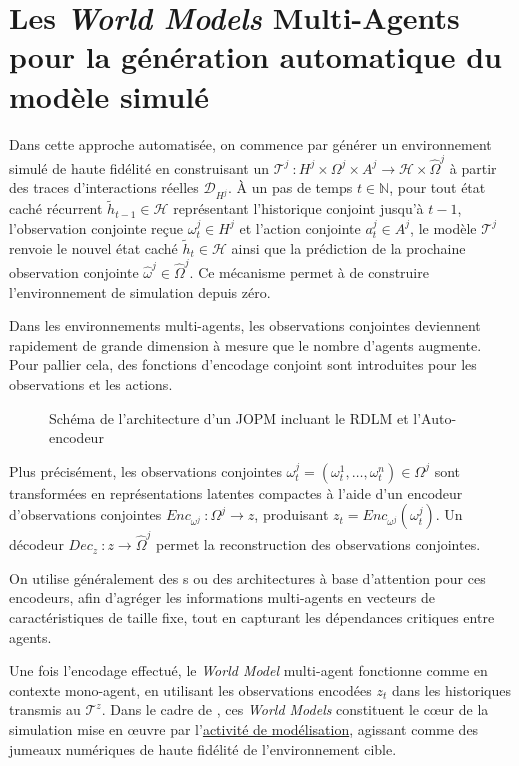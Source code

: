 \section{Les \textit{World Models} Multi-Agents pour la génération automatique du modèle simulé}

Dans cette approche automatisée, on commence par générer un environnement simulé de haute fidélité en construisant un  $\mathcal{T}^j~: H^j \times \Omega^j \times A^j \rightarrow \mathcal{H} \times \hat{\Omega}^j$ à partir des traces d'interactions réelles $\mathcal{D}_{H^j}$. À un pas de temps $t \in \mathbb{N}$, pour tout état caché récurrent $\tilde{h}_{t-1} \in \mathcal{H}$ représentant l'historique conjoint jusqu'à $t-1$, l'observation conjointe reçue $\omega_t^j \in H^j$ et l'action conjointe $a_t^j \in A^j$, le modèle $\mathcal{T}^j$ renvoie le nouvel état caché $\tilde{h}_t \in \mathcal{H}$ ainsi que la prédiction de la prochaine observation conjointe $\hat{\omega}^j \in \hat{\Omega}^j$. Ce mécanisme permet à  de construire l'environnement de simulation depuis zéro.

Dans les environnements multi-agents, les observations conjointes deviennent rapidement de grande dimension à mesure que le nombre d'agents augmente. Pour pallier cela, des fonctions d'encodage conjoint sont introduites pour les observations et les actions.

\begin{figure}[h]
  \centering
  \resizebox{\textwidth}{!}{%
    
  }
  \caption{Schéma de l'architecture d'un JOPM incluant le RDLM et l'Auto-encodeur}
  \label{fig:jopm_architecture}
\end{figure}


Plus précisément, les observations conjointes $\omega_t^{j} = (\omega_t^1, \dots, \omega_t^n) \in \Omega^{j}$ sont transformées en représentations latentes compactes à l'aide d'un encodeur d'observations conjointes $Enc_{\omega^j}~: \Omega^j \rightarrow z$, produisant $z_t = Enc_{\omega^j}(\omega_t^j)$. Un décodeur $Dec_z~: z \rightarrow \hat{\Omega}^j$ permet la reconstruction des observations conjointes.

On utilise généralement des s ou des architectures à base d'attention pour ces encodeurs, afin d'agréger les informations multi-agents en vecteurs de caractéristiques de taille fixe, tout en capturant les dépendances critiques entre agents.

Une fois l'encodage effectué, le \textit{World Model} multi-agent fonctionne comme en contexte mono-agent, en utilisant les observations encodées $z_t$ dans les historiques transmis au  $\mathcal{T}^{z}$. Dans le cadre de , ces \textit{World Models} constituent le cœur de la simulation mise en œuvre par l'\hyperref[sec:modelling]{activité de modélisation}, agissant comme des jumeaux numériques de haute fidélité de l'environnement cible.

